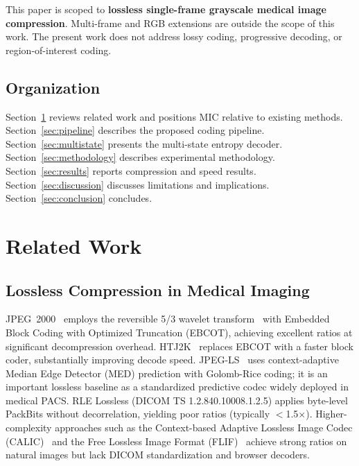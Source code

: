 \documentclass[journal]{IEEEtran}
\begin{document}
This paper is scoped to \textbf{lossless single-frame grayscale medical image
compression}. Multi-frame and RGB extensions are outside the scope of this
work. The present work does not address lossy coding, progressive decoding, or
region-of-interest coding.

\subsection{Organization}

Section~\ref{sec:related} reviews related work and positions MIC relative to
existing methods. Section~\ref{sec:pipeline} describes the proposed coding
pipeline. Section~\ref{sec:multistate} presents the multi-state entropy decoder.
Section~\ref{sec:methodology} describes experimental methodology.
Section~\ref{sec:results} reports compression and speed results.
Section~\ref{sec:discussion} discusses limitations and implications.
Section~\ref{sec:conclusion} concludes.

\section{Related Work}
\label{sec:related}

\subsection{Lossless Compression in Medical Imaging}

JPEG~2000~\cite{taubman2002} employs the reversible 5/3 wavelet
transform~\cite{legall1988,calderbank1998} with Embedded Block Coding with
Optimized Truncation (EBCOT), achieving excellent ratios at significant
decompression overhead. HTJ2K~\cite{htj2k2019,taubman2022}
replaces EBCOT with a faster block coder, substantially improving decode
speed. JPEG-LS~\cite{loco1,jpegls2} uses context-adaptive Median Edge
Detector (MED) prediction with Golomb-Rice coding; it is an important
lossless baseline as a standardized predictive codec widely deployed in
medical PACS. RLE Lossless (DICOM TS 1.2.840.10008.1.2.5) applies
byte-level PackBits without decorrelation, yielding poor ratios
(typically $<$1.5$\times$). Higher-complexity approaches such as the
Context-based Adaptive Lossless Image Codec (CALIC)~\cite{wu1997} and the
Free Lossless Image Format (FLIF)~\cite{sneyers2016} achieve strong ratios on
natural images but lack DICOM standardization and browser decoders.
\end{document}
